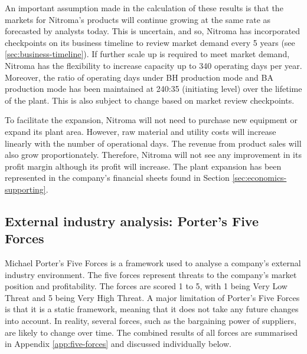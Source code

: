 An important assumption made in the calculation of these results is that the markets for Nitroma’s products will continue growing at the same rate as forecasted by analysts today. This is uncertain, and so, Nitroma has incorporated checkpoints on its business timeline to review market demand every 5 years (see \cref{sec:business-timeline}). If further scale up is required to meet market demand, Nitroma has the flexibility to increase capacity up to 340 operating days per year. Moreover, the ratio of operating days under BH production mode and BA production mode has been maintained at 240:35 (initiating level) over the lifetime of the plant. This is also subject to change based on market review checkpoints.

To facilitate the expansion, Nitroma will not need to purchase new equipment or expand its plant area. However, raw material and utility costs will increase linearly with the number of operational days. The revenue from product sales will also grow proportionately. Therefore, Nitroma will not see any improvement in its profit margin although its profit will increase. The plant expansion has been represented in the company’s financial sheets found in Section \ref{sec:economics-supporting}.

\subsection{External industry analysis: Porter's Five Forces}
\label{sec:five-forces}
Michael Porter’s Five Forces is a framework used to analyse a company’s external industry environment. The five forces represent threats to the company’s market position and profitability. The forces are scored 1 to 5, with 1 being Very Low Threat and 5 being Very High Threat. A major limitation of Porter’s Five Forces is that it is a static framework, meaning that it does not take any future changes into account. In reality, several forces, such as the bargaining power of suppliers, are likely to change over time. The combined results of all forces are summarised in Appendix \ref{app:five-forces} and discussed individually below.


